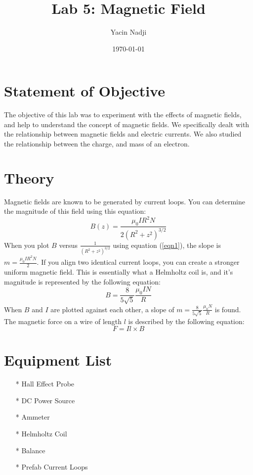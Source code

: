 \documentclass[titlepage]{article}
\title{Lab 5: Magnetic Field}
\author{Yacin Nadji}
\date{\today}
\begin{document}
\maketitle

\section{Statement of Objective}\label{sec:obj}
The objective of this lab was to experiment with the effects of magnetic fields, and help to understand the concept of magnetic fields. We specifically dealt with the relationship between magnetic fields and electric currents. We also studied the relationship between the charge, and mass of an electron.

\section{Theory}\label{sec:theory}
Magnetic fields are known to be generated by current loops. You can determine the magnitude of this field using this equation:
\begin{equation}\label{eqn1}
	B(z) = \frac{\mu_0 IR^2 N}{2(R^2 + z^2)^{3/2}}
\end{equation}
When you plot $B$ versus $\frac{1}{(R^2 + z^2)^{3/2}}$ using equation (\ref{eqn1}), the slope is $m = \frac{\mu_0 IR^2 N}{2}$. If you align two identical current loops, you can create a stronger uniform magnetic field. This is essentially what a Helmholtz coil is, and it's magnitude is represented by the following equation:
\begin{equation}\label{eqn2}
	B = \frac{8}{5\sqrt{5}} \frac{\mu_0 IN}{R}
\end{equation}
When $B$ and $I$ are plotted against each other, a slope of $m = \frac{8}{5\sqrt{5}} \frac{\mu_0 N}{R}$ is found. The magnetic force on a wire of length $l$ is described by the following equation:
\begin{equation}\label{eqn3}
	F = I l \times B
\end{equation}

\section{Equipment List}\label{sec:equipment_list}
\begin{itemize}
\item[*] Hall Effect Probe
\item[*] DC Power Source
\item[*] Ammeter
\item[*] Helmholtz Coil
\item[*] Balance
\item[*] Prefab Current Loops
\end{itemize}
\end{document}
